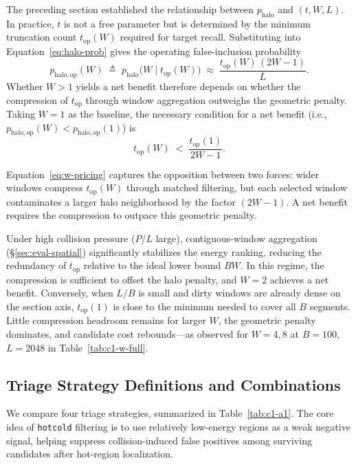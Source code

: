 The preceding section established the relationship between $p_{\mathrm{halo}}$ and $(t, W, L)$. In practice, $t$ is not a free parameter but is determined by the minimum truncation count $t_{\mathrm{op}}(W)$ required for target recall. Substituting into Equation~\eqref{eq:halo-prob} gives the operating false-inclusion probability
\begin{equation*}
p_{\mathrm{halo,op}}(W)
\;\triangleq\;
p_{\mathrm{halo}}\!\bigl(W \mid t_{\mathrm{op}}(W)\bigr)
\;\approx\;
\frac{t_{\mathrm{op}}(W)\,(2W{-}1)}{L}.
\end{equation*}
Whether $W>1$ yields a net benefit therefore depends on whether the compression of $t_{\mathrm{op}}$ through window aggregation outweighs the geometric penalty. Taking $W{=}1$ as the baseline, the necessary condition for a net benefit (i.e., $p_{\mathrm{halo,op}}(W)<p_{\mathrm{halo,op}}(1)$) is
\begin{equation}\label{eq:w-pricing}
t_{\mathrm{op}}(W) \;<\; \frac{t_{\mathrm{op}}(1)}{2W{-}1}.
\end{equation}

Equation~\eqref{eq:w-pricing} captures the opposition between two forces: wider windows compress $t_{\mathrm{op}}(W)$ through matched filtering, but each selected window contaminates a larger halo neighborhood by the factor $(2W{-}1)$. A net benefit requires the compression to outpace this geometric penalty.

Under high collision pressure ($P/L$ large), contiguous-window aggregation (\S\ref{sec:eval-spatial}) significantly stabilizes the energy ranking, reducing the redundancy of $t_{\mathrm{op}}$ relative to the ideal lower bound $BW$. In this regime, the compression is sufficient to offset the halo penalty, and $W{=}2$ achieves a net benefit. Conversely, when $L/B$ is small and dirty windows are already dense on the section axis, $t_{\mathrm{op}}(1)$ is close to the minimum needed to cover all $B$ segments. Little compression headroom remains for larger $W$, the geometric penalty dominates, and candidate cost rebounds---as observed for $W{=}4,8$ at $B{=}100$, $L{=}2048$ in Table~\ref{tab:c1-w-full}.


\subsection{Triage Strategy Definitions and Combinations}
\label{sec:appendix-c1-a1}

We compare four triage strategies, summarized in Table~\ref{tab:c1-a1}. The core idea of \texttt{hotcold} filtering is to use relatively low-energy regions as a weak negative signal, helping suppress collision-induced false positives among surviving candidates after hot-region localization.

